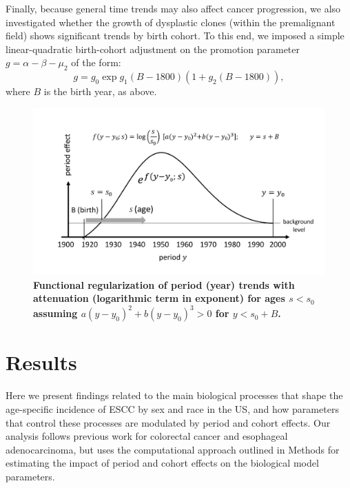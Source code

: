 \documentclass[10pt,letterpaper]{article}
\begin{document}
Finally, because general time trends may also affect cancer progression, we also investigated whether the growth of dysplastic clones (within the premalignant field) shows significant trends by birth cohort. To this end, we imposed a simple linear-quadratic birth-cohort adjustment on the promotion parameter $g=\alpha-\beta-\mu_2$ of the form:
$$g=g_0 \exp{g_1(B-1800)(1+g_2(B-1800))},$$
where $B$ is the birth year, as above.  
\medskip
\begin{figure}[!ht]
\includegraphics[scale=0.7, trim=0 0 0 0]{RegularizationFEFF.pdf}
\caption{{\bf Functional regularization of period (year) trends with attenuation (logarithmic term in exponent) for ages $s<s_0$ assuming $a(y-y_0)^2+b(y-y_0)^3 > 0$ for $y < s_0+B$.}}
\label{fig2}
\end{figure}


\section*{Results}
Here we present findings related to the main biological processes that shape the age-specific incidence of ESCC by sex and race in the US, and how parameters that control these processes are modulated by period and cohort effects. Our analysis follows previous work for colorectal cancer and esophageal adenocarcinoma, but uses the computational approach outlined in Methods for estimating the impact of period and cohort effects on the biological model parameters.
\end{document}
